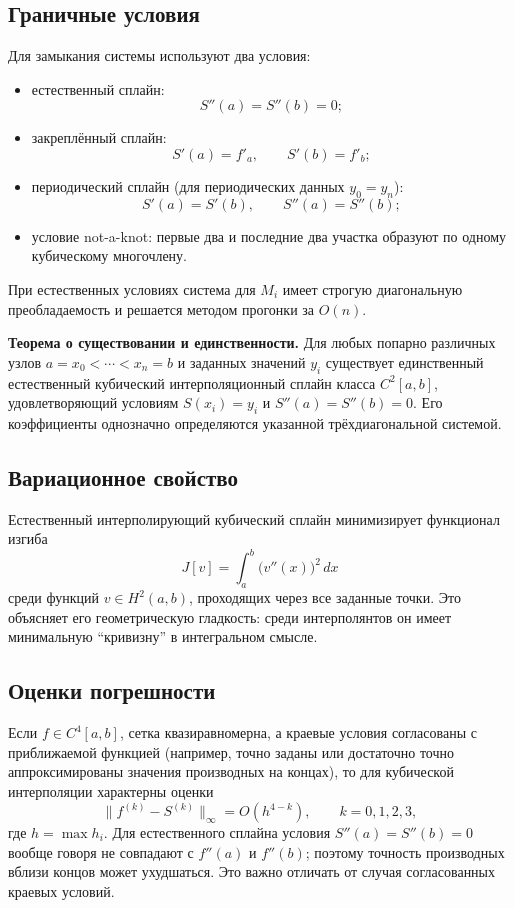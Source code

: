 \subsection{Граничные условия}

Для замыкания системы используют два условия:
\begin{itemize}
    \item естественный сплайн:
    \[
        S''(a)=S''(b)=0;
    \]
    \item закреплённый сплайн:
    \[
        S'(a)=f'_a,
        \qquad
        S'(b)=f'_b;
    \]
    \item периодический сплайн (для периодических данных $y_0=y_n$):
    \[
        S'(a)=S'(b),\qquad S''(a)=S''(b);
    \]
    \item условие not-a-knot: первые два и последние два участка образуют по
          одному кубическому многочлену.
\end{itemize}

При естественных условиях система для $M_i$ имеет строгую диагональную
преобладаемость и решается методом прогонки за $O(n)$.

\textbf{Теорема о существовании и единственности.}
Для любых попарно различных узлов $a=x_0<\cdots<x_n=b$ и заданных значений
$y_i$ существует единственный естественный кубический интерполяционный сплайн
класса $C^2[a,b]$, удовлетворяющий условиям $S(x_i)=y_i$ и
$S''(a)=S''(b)=0$. Его коэффициенты однозначно определяются указанной
трёхдиагональной системой.

\subsection{Вариационное свойство}

Естественный интерполирующий кубический сплайн минимизирует функционал изгиба
\[
    J[v]=\int_a^b\bigl(v''(x)\bigr)^2\,dx
\]
среди функций $v\in H^2(a,b)$, проходящих через все заданные точки.
Это объясняет его геометрическую гладкость: среди интерполянтов он имеет
минимальную ``кривизну'' в интегральном смысле.

\subsection{Оценки погрешности}

Если $f\in C^4[a,b]$, сетка квазиравномерна, а краевые условия согласованы
с приближаемой функцией (например, точно заданы или достаточно точно
аппроксимированы значения производных на концах), то для кубической
интерполяции характерны оценки
\[
    \|f^{(k)}-S^{(k)}\|_{\infty}=O(h^{4-k}),
    \qquad k=0,1,2,3,
\]
где $h=\max h_i$. Для естественного сплайна условия $S''(a)=S''(b)=0$
вообще говоря не совпадают с $f''(a)$ и $f''(b)$; поэтому точность производных
вблизи концов может ухудшаться. Это важно отличать от случая согласованных
краевых условий.

